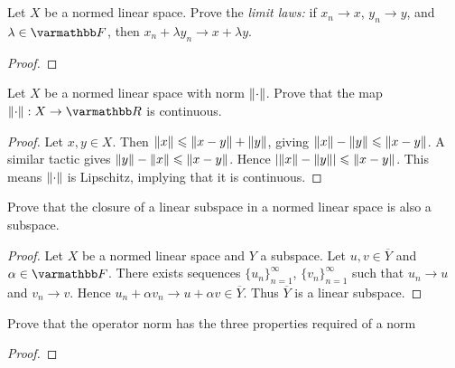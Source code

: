 \section*{}

\begin{exercise}
Let $X$ be a normed linear space. Prove the \textit{limit laws:} if $x_n \rightarrow x$, $y_n \rightarrow y$, and $\lambda \in \bfF$, then $x_n + \lambda y_n \rightarrow x+\lambda y$.
\end{exercise}
    {\color{red} \begin{proof}
    
    \end{proof}}

\begin{exercise}
Let $X$ be a normed linear space with norm $\left\lVert \cdot \right\rVert$. Prove that the map $\lnorm \cdot \rnorm:X \rightarrow \bfR$ is continuous.
\end{exercise}
    \begin{proof}
        Let $x,y \in X$. Then $\left\lVert x \right\rVert \leqslant \left\lVert x - y \right\rVert + \left\lVert y \right\rVert$, giving $\left\lVert x \right\rVert - \left\lVert y \right\rVert \leqslant \left\lVert x-y \right\rVert$. A similar tactic gives $\left\lVert  y\right\rVert - \left\lVert x \right\rVert \leqslant \left\lVert x - y \right\rVert$. Hence $\left| \left\lVert x \right\rVert - \left\lVert y \right\rVert \right| \leqslant \left\lVert x - y \right\rVert$. This means $\left\lVert \cdot \right\rVert$ is Lipschitz, implying that it is continuous.
    \end{proof}

\begin{exercise}
Prove that the closure of a linear subspace in a normed linear space is also a subspace.
\end{exercise}
    \begin{proof}
        Let $X$ be a normed linear space and $Y$ a subspace. Let $u,v \in \overline{Y}$ and $\alpha \in \bfF$. There exists sequences $\{u_n\}_{n = 1}^\infty$, $\{v_n\}_{n = 1}^\infty$ such that $u_n \rightarrow u$ and $v_n \rightarrow v$. Hence $u_n + \alpha v_n \rightarrow u+\alpha v \in \overline{Y}$. Thus $\overline{Y}$ is a linear subspace.
    \end{proof}

\begin{exercise}
Prove that the operator norm has the three properties required of a norm
\end{exercise}
    {\color{red} \begin{proof}
    
    \end{proof}}

